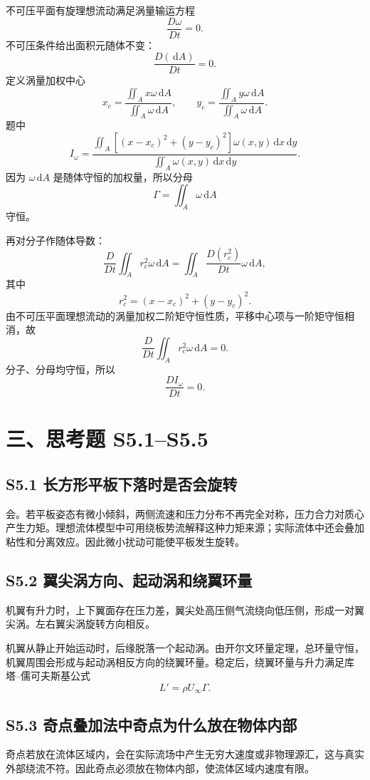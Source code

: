 \documentclass[UTF8,zihao=-4]{ctexart}
\newcommand{\dd}{\,\mathrm d}
\begin{document}
不可压平面有旋理想流动满足涡量输运方程
\[
\frac{D\omega}{Dt}=0.
\]
不可压条件给出面积元随体不变：
\[
\frac{D(\dd A)}{Dt}=0.
\]
定义涡量加权中心
\[
x_c=\frac{\iint_A x\omega\dd A}{\iint_A\omega\dd A},
\qquad
y_c=\frac{\iint_A y\omega\dd A}{\iint_A\omega\dd A}.
\]
题中
\[
I_\omega=
\frac{
\iint_A[(x-x_c)^2+(y-y_c)^2]\omega(x,y)\dd x\dd y}
{\iint_A\omega(x,y)\dd x\dd y}.
\]
因为 \(\omega\dd A\) 是随体守恒的加权量，所以分母
\[
\Gamma=\iint_A\omega\dd A
\]
守恒。

再对分子作随体导数：
\[
\frac{D}{Dt}\iint_A r_c^2\omega\dd A
=\iint_A \frac{D(r_c^2)}{Dt}\omega\dd A,
\]
其中
\[
r_c^2=(x-x_c)^2+(y-y_c)^2.
\]
由不可压平面理想流动的涡量加权二阶矩守恒性质，平移中心项与一阶矩守恒相消，故
\[
\frac{D}{Dt}\iint_A r_c^2\omega\dd A=0.
\]
分子、分母均守恒，所以
\[
\boxed{\frac{DI_\omega}{Dt}=0.}
\]

\section*{三、思考题 S5.1--S5.5}

\subsection*{S5.1 长方形平板下落时是否会旋转}

会。若平板姿态有微小倾斜，两侧流速和压力分布不再完全对称，压力合力对质心产生力矩。理想流体模型中可用绕板势流解释这种力矩来源；实际流体中还会叠加粘性和分离效应。因此微小扰动可能使平板发生旋转。

\subsection*{S5.2 翼尖涡方向、起动涡和绕翼环量}

机翼有升力时，上下翼面存在压力差，翼尖处高压侧气流绕向低压侧，形成一对翼尖涡。左右翼尖涡旋转方向相反。

机翼从静止开始运动时，后缘脱落一个起动涡。由开尔文环量定理，总环量守恒，机翼周围会形成与起动涡相反方向的绕翼环量。稳定后，绕翼环量与升力满足库塔--儒可夫斯基公式
\[
L'=\rho U_\infty \Gamma .
\]

\subsection*{S5.3 奇点叠加法中奇点为什么放在物体内部}

奇点若放在流体区域内，会在实际流场中产生无穷大速度或非物理源汇，这与真实外部绕流不符。因此奇点必须放在物体内部，使流体区域内速度有限。
\end{document}
